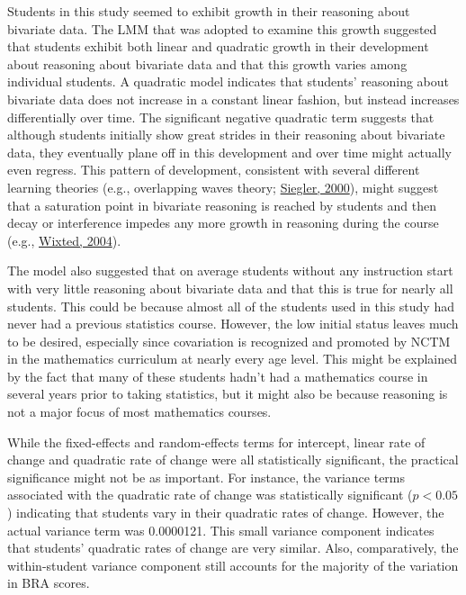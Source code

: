 \documentclass[11pt]{umnthesis}
\begin{document}
Students in this study seemed to exhibit growth in their reasoning about bivariate data. The LMM that was adopted to examine this growth suggested that students exhibit both linear and quadratic growth in their development about reasoning about bivariate data and that this growth varies among individual students. A quadratic model indicates that students' reasoning about bivariate data does not increase in a constant linear fashion, but instead increases differentially over time. The significant negative quadratic term suggests that although students initially show great strides in their reasoning about bivariate data, they eventually plane off in this development and over time might actually even regress. This pattern of development, consistent with several different learning theories (e.g., overlapping waves theory; \protect\hyperlink{ref-siegler:2000}{Siegler, 2000}), might suggest that a saturation point in bivariate reasoning is reached by students and then decay or interference impedes any more growth in reasoning during the course (e.g., \protect\hyperlink{ref-wixted:2004}{Wixted, 2004}).

The model also suggested that on average students without any instruction start with very little reasoning about bivariate data and that this is true for nearly all students. This could be because almost all of the students used in this study had never had a previous statistics course. However, the low initial status leaves much to be desired, especially since covariation is recognized and promoted by NCTM in the mathematics curriculum at nearly every age level. This might be explained by the fact that many of these students hadn't had a mathematics course in several years prior to taking statistics, but it might also be because reasoning is not a major focus of most mathematics courses.

While the fixed-effects and random-effects terms for intercept, linear rate of change and quadratic rate of change were all statistically significant, the practical significance might not be as important. For instance, the variance terms associated with the quadratic rate of change was statistically significant (\(p<0.05\)) indicating that students vary in their quadratic rates of change. However, the actual variance term was 0.0000121. This small variance component indicates that students' quadratic rates of change are very similar. Also, comparatively, the within-student variance component still accounts for the majority of the variation in BRA scores.
\end{document}
